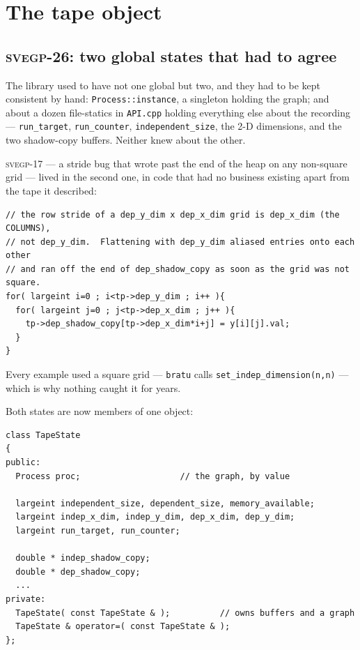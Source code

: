 \documentclass[11pt,a4paper]{report}
\newcommand{\svegp}[1]{\textsc{svegp-#1}}
\newcommand{\code}[1]{\texttt{#1}}
\begin{document}
\chapter{The tape object}
\label{ch:tape}

\section{\svegp{26}: two global states that had to agree}

The library used to have not one global but two, and they had to be kept
consistent by hand: \code{Process::instance}, a singleton holding the graph;
and about a dozen file-statics in \code{API.cpp} holding everything else about
the recording --- \code{run\_target}, \code{run\_counter},
\code{independent\_size}, the 2-D dimensions, and the two shadow-copy buffers.
Neither knew about the other.

\svegp{17} --- a stride bug that wrote past the end of the heap on any
non-square grid --- lived in the second one, in code that had no business
existing apart from the tape it described:

\begin{lstlisting}
// the row stride of a dep_y_dim x dep_x_dim grid is dep_x_dim (the COLUMNS),
// not dep_y_dim.  Flattening with dep_y_dim aliased entries onto each other
// and ran off the end of dep_shadow_copy as soon as the grid was not square.
for( largeint i=0 ; i<tp->dep_y_dim ; i++ ){
  for( largeint j=0 ; j<tp->dep_x_dim ; j++ ){
    tp->dep_shadow_copy[tp->dep_x_dim*i+j] = y[i][j].val;
  }
}
\end{lstlisting}

Every example used a square grid --- \code{bratu} calls
\code{set\_indep\_dimension(n,n)} --- which is why nothing caught it for years.

Both states are now members of one object:

\begin{lstlisting}
class TapeState
{
public:
  Process proc;                    // the graph, by value

  largeint independent_size, dependent_size, memory_available;
  largeint indep_x_dim, indep_y_dim, dep_x_dim, dep_y_dim;
  largeint run_target, run_counter;

  double * indep_shadow_copy;
  double * dep_shadow_copy;
  ...
private:
  TapeState( const TapeState & );          // owns buffers and a graph
  TapeState & operator=( const TapeState & );
};
\end{lstlisting}
\end{document}
